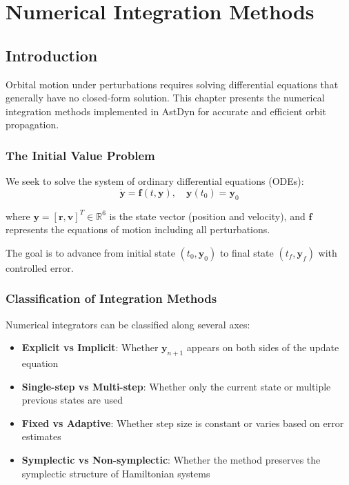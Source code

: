 \chapter{Numerical Integration Methods}
\label{ch:numerical_integration}

\section{Introduction}

Orbital motion under perturbations requires solving differential equations that generally have no closed-form solution. This chapter presents the numerical integration methods implemented in AstDyn for accurate and efficient orbit propagation.

\subsection{The Initial Value Problem}

We seek to solve the system of ordinary differential equations (ODEs):
\begin{equation}
    \dot{\mathbf{y}} = \mathbf{f}(t, \mathbf{y}), \quad \mathbf{y}(t_0) = \mathbf{y}_0
\end{equation}

where $\mathbf{y} = [\mathbf{r}, \mathbf{v}]^T \in \mathbb{R}^6$ is the state vector (position and velocity), and $\mathbf{f}$ represents the equations of motion including all perturbations.

The goal is to advance from initial state $(t_0, \mathbf{y}_0)$ to final state $(t_f, \mathbf{y}_f)$ with controlled error.

\subsection{Classification of Integration Methods}

Numerical integrators can be classified along several axes:

\begin{itemize}
    \item \textbf{Explicit vs Implicit}: Whether $\mathbf{y}_{n+1}$ appears on both sides of the update equation
    \item \textbf{Single-step vs Multi-step}: Whether only the current state or multiple previous states are used
    \item \textbf{Fixed vs Adaptive}: Whether step size is constant or varies based on error estimates
    \item \textbf{Symplectic vs Non-symplectic}: Whether the method preserves the symplectic structure of Hamiltonian systems
\end{itemize}

